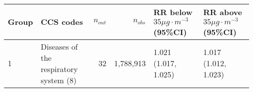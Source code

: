 \begin{tabular}{lp{6.5cm}rrp{2.2cm}p{2.2cm}}
  \hline
Group & CCS codes & $n_{out}$ & $n_{obs}$ & RR below $35 \mu g \cdot m^{-3}$ (95\%CI) & RR above $35 \mu g \cdot m^{-3}$ (95\%CI) \\ 
  \hline
   1 & Diseases of the respiratory system (8) &   32 & 1,788,913 & 1.021 (1.017, 1.025) & 1.017 (1.012, 1.023) \\ 
   \hline
\end{tabular}

